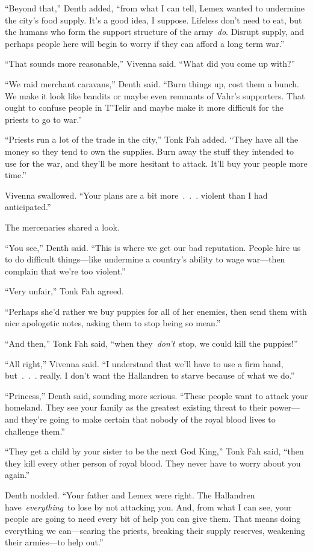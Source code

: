 “Beyond that,” Denth added, “from what I can tell, Lemex wanted to undermine the city’s food supply. It’s a good idea, I suppose. Lifeless don’t need to eat, but the humans who form the support structure of the army~\textit{do}. Disrupt supply, and perhaps people here will begin to worry if they can afford a long term war.”

“That sounds more reasonable,” Vivenna said. “What did you come up with?”

“We raid merchant caravans,” Denth said. “Burn things up, cost them a bunch. We make it look like bandits or maybe even remnants of Vahr’s supporters. That ought to confuse people in T’Telir and maybe make it more difficult for the priests to go to war.”

“Priests run a lot of the trade in the city,” Tonk Fah added. “They have all the money so they tend to own the supplies. Burn away the stuff they intended to use for the war, and they’ll be more hesitant to attack. It’ll buy your people more time.”

Vivenna swallowed. “Your plans are a bit more~.~.~. violent than I had anticipated.”

The mercenaries shared a look.

“You see,” Denth said. “This is where we get our bad reputation. People hire us to do difficult things—like undermine a country’s ability to wage war—then complain that we’re too violent.”

“Very unfair,” Tonk Fah agreed.

“Perhaps she’d rather we buy puppies for all of her enemies, then send them with nice apologetic notes, asking them to stop being so mean.”

“And then,” Tonk Fah said, “when they~\textit{don’t}~stop, we could kill the puppies!”

“All right,” Vivenna said. “I understand that we’ll have to use a firm hand, but~.~.~. really. I don’t want the Hallandren to starve because of what we do.”

“Princess,” Denth said, sounding more serious. “These people want to attack your homeland. They see your family as the greatest existing threat to their power—and they’re going to make certain that nobody of the royal blood lives to challenge them.”

“They get a child by your sister to be the next God King,” Tonk Fah said, “then they kill every other person of royal blood. They never have to worry about you again.”

Denth nodded. “Your father and Lemex were right. The Hallandren have~\textit{everything}~to lose by not attacking you. And, from what I can see, your people are going to need every bit of help you can give them. That means doing everything we can—scaring the priests, breaking their supply reserves, weakening their armies—to help out.”


